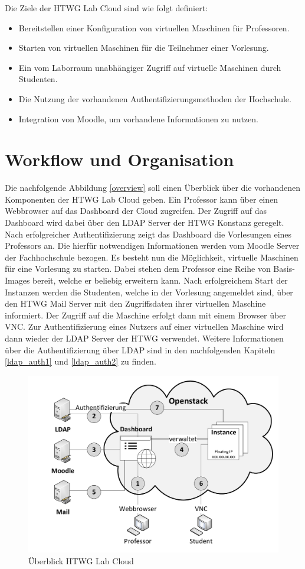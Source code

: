 Die Ziele der HTWG Lab Cloud sind wie folgt definiert:
\begin{itemize}
\item Bereitstellen einer Konfiguration von virtuellen Maschinen für Professoren.
\item Starten von virtuellen Maschinen für die Teilnehmer einer Vorlesung.
\item Ein vom Laborraum unabhängiger Zugriff auf virtuelle Maschinen durch Studenten.
\item Die Nutzung der vorhandenen Authentifizierungsmethoden der Hochschule.
\item Integration von Moodle, um vorhandene Informationen zu nutzen.
\end{itemize}

\section{Workflow und Organisation}
Die nachfolgende Abbildung \autoref{overview} soll einen Überblick über 
die vorhandenen Komponenten der HTWG Lab Cloud geben.
Ein Professor kann über einen
Webbrowser auf das Dashboard der Cloud zugreifen. Der Zugriff auf das Dashboard wird dabei
über den LDAP Server der HTWG Konstanz geregelt. Nach erfolgreicher Authentifizierung 
zeigt das Dashboard die Vorlesungen eines Professors an. Die hierfür notwendigen Informationen
werden vom Moodle Server der Fachhochschule bezogen. 
Es besteht nun die Möglichkeit, virtuelle Maschinen für eine Vorlesung zu starten.
Dabei stehen dem Professor eine Reihe von Basis-Images bereit, welche er beliebig erweitern kann.
Nach erfolgreichem Start der Instanzen werden die
Studenten, welche in der Vorlesung angemeldet sind, über den HTWG Mail Server mit den
Zugriffsdaten ihrer virtuellen Maschine informiert. Der Zugriff auf die Maschine erfolgt dann mit
einem Browser über VNC. Zur Authentifizierung eines Nutzers auf einer virtuellen Maschine wird
dann wieder der LDAP Server der HTWG verwendet.
Weitere Informationen über die Authentifizierung über LDAP sind in den nachfolgenden
Kapiteln \ref{ldap_auth1} und \ref{ldap_auth2} zu finden.


\begin{figure}[H]
	\centering
	\includegraphics[scale=0.5]{img/overview.pdf}
\caption{Überblick HTWG Lab Cloud}
\label{overview}
\FloatBarrier
\end{figure}

